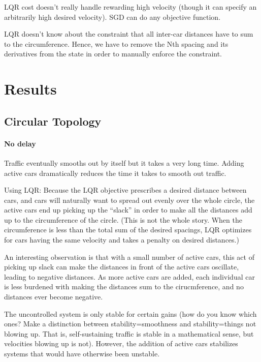 \documentclass[10pt,twocolumn]{article}
\begin{document}
LQR cost doesn't really handle rewarding high velocity (though it can specify an arbitrarily high desired velocity). SGD can do any objective function.

LQR doesn't know about the constraint that all inter-car distances have to sum to the circumference. Hence, we have to remove the Nth spacing and its derivatives from the state in order to manually enforce the constraint.

\section{Results}

\subsection{Circular Topology}

\paragraph{No delay} Traffic eventually smooths out by itself but it takes a very long time. Adding active cars dramatically reduces the time it takes to smooth out traffic. 

Using LQR: Because the LQR objective prescribes a desired distance between cars, and cars will naturally want to spread out evenly over the whole circle, the active cars end up picking up the ``slack'' in order to make all the distances add up to the circumference of the circle. (This is not the whole story. When the circumference is less than the total sum of the desired spacings, LQR optimizes for cars having the same velocity and takes a penalty on desired distances.)

An interesting observation is that with a small number of active cars, this act of picking up slack can make the distances in front of the active cars oscillate, leading to negative distances. As more active cars are added, each individual car is less burdened with making the distances sum to the cirucmference, and no distances ever become negative.

The uncontrolled system is only stable for certain gains (how do you know which ones? Make a distinction between stability=smoothness and stability=things not blowing up. That is, self-sustaining traffic is stable in a mathematical sense, but velocities blowing up is not). However, the addition of active cars stabilizes systems that would have otherwise been unstable.
\end{document}

